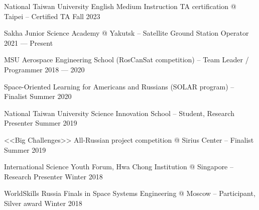 National Taiwan University English Medium Instruction TA certification @ Taipei -- Certified TA \hfill Fall 2023

Sakha Junior Science Academy @ Yakutsk -- Satellite Ground Station Operator \hfill 2021 --- Present

MSU Aerospace Engineering School (RosCanSat competition) -- Team Leader / Programmer	\hfill 2018 --- 2020
 
Space-Oriented Learning for Americans and Russians (SOLAR program) -- Finalist	\hfill Summer 2020

National Taiwan University Science Innovation School -- Student, Research Presenter	\hfill Summer 2019

<<Big Challenges>> All-Russian project competition @ Sirius Center -- Finalist	\hfill Summer 2019

International Science Youth Forum, Hwa Chong Institution @ Singapore -- Research Presenter	\hfill Winter 2018

WorldSkills Russia Finals in Space Systems Engineering @ Moscow -- Participant, Silver award	\hfill Winter 2018

